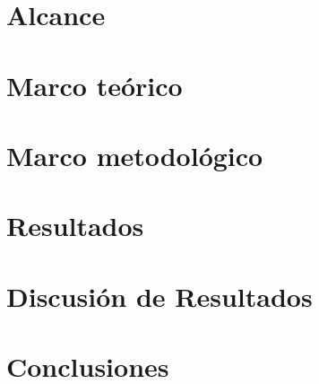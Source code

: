 \documentclass[11pt, letterpaper, twoside, openright]{report}
\newcommand{\defaultparformat}[1]{
	{\setlength{\parskip}{2ex}
     }
}
\begin{document}
\ifdefined\CAPalcance
	\newpage
	\chapter{Alcance}
	\ifdefined\parpordefecto
    	\defaultparformat{h-alcance}
    \else
    	
    \fi 
\fi

\ifdefined\CAPmarcoteorico
	\newpage
	\chapter{Marco teórico}
	\ifdefined\parpordefecto
		\defaultparformat{i-marco_teorico}
	\else
		
	\fi
\fi

\ifdefined\CAPmarcometodologico
	\newpage
	\chapter{Marco metodológico}
	\ifdefined\parpordefecto
		\defaultparformat{p-marco_metodologico}
	\else
	
	\fi
\fi

\ifdefined\CAPresultados
	\newpage
	\chapter{Resultados}
	\ifdefined\parpordefecto
		\defaultparformat{q-resultados}
	\else
		
	\fi
\fi

\ifdefined\CAPdiscusion
	\newpage
	\chapter{Discusión de Resultados}
	\ifdefined\parpordefecto
		\defaultparformat{s-discusion}
	\else
		
	\fi
\fi

\ifdefined\CAPconclusiones
	\newpage
	\chapter{Conclusiones}
	\ifdefined\parpordefecto
		\defaultparformat{k-conclusiones}
	\else
		
	\fi
\fi
\end{document}
